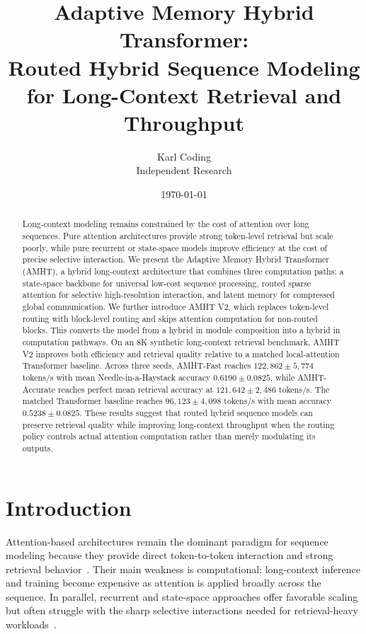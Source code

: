 \documentclass[11pt]{article}
\title{Adaptive Memory Hybrid Transformer:\\Routed Hybrid Sequence Modeling for Long-Context Retrieval and Throughput}
\author{Karl Coding\\Independent Research}
\date{\today}
\begin{document}
\maketitle

\begin{abstract}
Long-context modeling remains constrained by the cost of attention over long sequences. Pure attention architectures provide strong token-level retrieval but scale poorly, while pure recurrent or state-space models improve efficiency at the cost of precise selective interaction. We present the Adaptive Memory Hybrid Transformer (AMHT), a hybrid long-context architecture that combines three computation paths: a state-space backbone for universal low-cost sequence processing, routed sparse attention for selective high-resolution interaction, and latent memory for compressed global communication. We further introduce AMHT V2, which replaces token-level routing with block-level routing and skips attention computation for non-routed blocks. This converts the model from a hybrid in module composition into a hybrid in computation pathways. On an 8K synthetic long-context retrieval benchmark, AMHT V2 improves both efficiency and retrieval quality relative to a matched local-attention Transformer baseline. Across three seeds, AMHT-Fast reaches $122{,}862 \pm 5{,}774$ tokens/s with mean Needle-in-a-Haystack accuracy $0.6190 \pm 0.0825$, while AMHT-Accurate reaches perfect mean retrieval accuracy at $121{,}642 \pm 2{,}486$ tokens/s. The matched Transformer baseline reaches $96{,}123 \pm 4{,}098$ tokens/s with mean accuracy $0.5238 \pm 0.0825$. These results suggest that routed hybrid sequence models can preserve retrieval quality while improving long-context throughput when the routing policy controls actual attention computation rather than merely modulating its outputs.
\end{abstract}

\section{Introduction}
Attention-based architectures remain the dominant paradigm for sequence modeling because they provide direct token-to-token interaction and strong retrieval behavior~\citep{vaswani2017attention}. Their main weakness is computational: long-context inference and training become expensive as attention is applied broadly across the sequence. In parallel, recurrent and state-space approaches offer favorable scaling but often struggle with the sharp selective interactions needed for retrieval-heavy workloads~\citep{gu2021combining,gu2022s4,dao2024mamba}.
\end{document}
